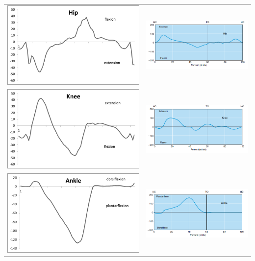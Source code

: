 \begin{center}
    \begin{tabular}{cc}
        \includegraphics[width=.48\textwidth, keepaspectratio]{fig/id-hip.png} & \includegraphics[width=.48\textwidth, keepaspectratio]{fig/id-hip-ref.png}\\[3pt]
        \includegraphics[width=.48\textwidth, keepaspectratio]{fig/id-knee.png} & \includegraphics[width=.48\textwidth, keepaspectratio]{fig/id-knee-ref.png}\\[3pt]
        \includegraphics[width=.48\textwidth, keepaspectratio]{fig/id-ankle.png} & \includegraphics[width=.48\textwidth, keepaspectratio]{fig/id-ankle-ref.png}
    \end{tabular}
    \label{tab:id-hip-knee-ankle-moments}
\end{center}
